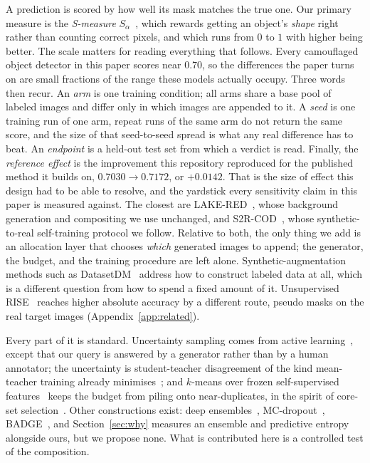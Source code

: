 \documentclass{article}
\newif\ifrevmarked \revmarkedtrue
\DeclareRobustCommand{\revA}[1]{\ifrevmarked{\color{RevA}#1}\else{#1}\fi}
\begin{document}
A prediction is scored by how well its mask matches the true one. Our primary measure is the \emph{S-measure} $S_\alpha$~\citep{fan2017structure}, which rewards getting an object's \emph{shape} right rather than counting correct pixels, and which runs
from $0$ to $1$ with higher being better. The scale matters for reading everything that follows. Every
camouflaged object detector in this paper scores near $0.70$, so the differences the paper turns on are small fractions
of the range these models actually occupy. Three words then recur. An \textit{arm} is one training
condition; all arms share a base pool of labeled images and differ only in which images are
appended to it. A \textit{seed} is one training run of one arm, repeat runs of the same arm do
not return the same score, and the size of that seed-to-seed spread is what any real difference has
to beat. An \textit{endpoint} is a held-out test set from which a verdict is read. Finally, the
\textit{reference effect} is the improvement this repository reproduced for the published method it
builds on, $0.7030 \rightarrow 0.7172$, or $+0.0142$. That is the size of effect this design had to
be able to resolve, and the yardstick every sensitivity claim in this paper is measured against. The closest are LAKE-RED~\citep{zhao2024lakered}, whose background generation and compositing we use unchanged, and
S2R-COD~\citep{luo2025s2rcod}, whose synthetic-to-real self-training protocol we follow. Relative to
both, the only thing we add is an allocation layer that chooses \emph{which} generated images to
append; the generator, the budget, and the training procedure are left alone. Synthetic-augmentation methods such as DatasetDM~\citep{wu2023datasetdm} address how to construct labeled data at all, which is a different question from how to spend a fixed amount of it. \revA{Unsupervised RISE~\citep{du2025rise} reaches higher absolute accuracy by a different route, pseudo masks on the real target images (Appendix~\ref{app:related}).}

Every part of it is standard. Uncertainty sampling comes from active learning~\citep{settles2009active}, except that our query is answered by a generator rather than by a human annotator; the uncertainty is student-teacher disagreement of the
kind mean-teacher training already minimises~\citep{tarvainen2017mean}; and $k$-means over frozen
self-supervised features~\citep{oquab2024dinov2,radford2021learning} keeps the budget from piling
onto near-duplicates, in the spirit of core-set selection~\citep{sener2018active}. Other
constructions exist: deep ensembles~\citep{lakshminarayanan2017simple},
MC-dropout~\citep{gal2016dropout}, BADGE~\citep{ash2020deep}, and Section~\ref{sec:why} measures
an ensemble and predictive entropy alongside ours, but we propose none. What is contributed here is a controlled test of the composition. 
\end{document}
